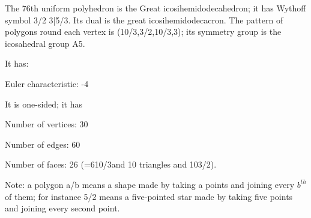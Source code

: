 The 76th uniform polyhedron is the Great icosihemidodecahedron; it has Wythoff symbol 3/2 3|5/3. Its dual is the great icosihemidodecacron. The pattern of polygons round each vertex is (10/3,3/2,10/3,3); its symmetry group is the icosahedral group A5.\par
It has:\par
Euler characteristic: -4\par
It is one-sided; it has\par
Number of vertices: 30\par
Number of edges:  60\par
Number of faces: 26 (=6{10/3}and 10 triangles and 10{3/2}).\par
Note: a polygon a/b means a shape made by taking a points and joining every $b^{th}$  of them; for instance 5/2 means a five-pointed star made by taking five points and joining every second point.